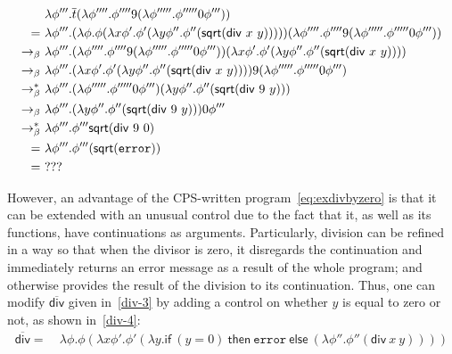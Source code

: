 \begin{example}
\begin{align}
& \lambda \phi'''. \overline{t} (\lambda \phi''''. \phi'''' 9 (\lambda \phi'''''. \phi''''' 0 \phi''')) \notag \\
 = \ & \lambda \phi'''. (\lambda \phi. \phi ( \lambda x \phi'. \phi' ( \lambda y \phi ''. \phi''  (\mathsf{sqrt} ( \mathsf{div} \ x\ y ))))) (\lambda \phi''''. \phi'''' 9 (\lambda \phi'''''. \phi''''' 0 \phi''')) \notag \\
  \bconv  \ & \lambda \phi'''.  (\lambda \phi''''. \phi'''' 9 (\lambda \phi'''''. \phi''''' 0 \phi''')) ( \lambda x \phi'. \phi' ( \lambda y \phi ''. \phi''  (\mathsf{sqrt} ( \mathsf{div} \ x\ y ))))\notag \\  
    \bconv  \ & \lambda \phi'''.  ( \lambda x \phi'. \phi' ( \lambda y \phi ''. \phi''  (\mathsf{sqrt} ( \mathsf{div} \ x\ y )))) 9 (\lambda \phi'''''. \phi''''' 0 \phi''')\notag \\
     \bred  \ & \lambda \phi'''.   (\lambda \phi'''''. \phi''''' 0 \phi''') ( \lambda y \phi ''. \phi''  (\mathsf{sqrt} ( \mathsf{div} \ 9\ y ))) \notag \\ 
 \bconv  \ & \lambda \phi'''.    ( \lambda y \phi ''. \phi''  (\mathsf{sqrt} ( \mathsf{div} \ 9\ y )))  0 \phi'''\notag \\
\bred \ & \lambda \phi'''. \phi''' \mathsf{sqrt} (\mathsf{div} \ 9 \ 0)  \notag \\
 =  \ & \lambda \phi'''. \phi''' (\mathsf{sqrt} (\mathtt{error} )) \label{sqrterrowCPS}\\
 =   \ & ??? \notag
\end{align} \qex \label{ex:divbyzeroCPStransformed}
\end{example}

However, an advantage of the CPS-written program~\eqref{eq:exdivbyzero} is that it can be extended with an unusual control due to the fact that it, as well as its functions, have continuations as arguments. Particularly, division can be refined in a way so that when the divisor is zero, it disregards the continuation and immediately returns an error message as a result of the whole program; and otherwise provides the result of the division to its continuation. 
Thus, one can modify $\overline{\mathsf{div}}$ given in~\eqref{div-3} by adding a control on whether $y$ is equal to zero or not, as shown in~\eqref{div-4}:
%
\begin{align}
\overline{\mathsf{div}} = \ & \lambda \phi . \phi ( \lambda x \phi'. \phi' ( \lambda y .  \mathsf{if} \ (y =0)  \ \mathsf{then} \ \mathtt{error}  \ \mathsf{else}  \  (\lambda \phi''. \phi'' (\mathsf{div} \ x \ y) )) ) \label{div-4}
\end{align} 

